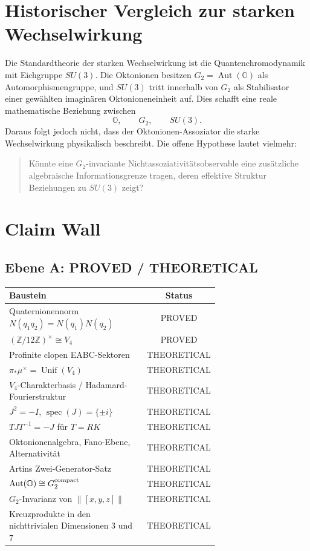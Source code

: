 \documentclass[11pt,a4paper]{article}
\newcommand{\OO}{\mathbb O}
\newcommand{\ZZ}{\mathbb Z}
\newcommand{\norm}[1]{\left\lVert #1 \right\rVert}
\newcommand{\Aut}{\operatorname{Aut}}
\newcommand{\Unif}{\operatorname{Unif}}
\begin{document}
\section{Historischer Vergleich zur starken Wechselwirkung}
Die Standardtheorie der starken Wechselwirkung ist die Quantenchromodynamik mit Eichgruppe $SU(3)$. Die Oktonionen besitzen $G_2=\Aut(\OO)$ als Automorphismengruppe, und $SU(3)$ tritt innerhalb von $G_2$ als Stabilisator einer gewählten imaginären Oktonioneneinheit auf. Dies schafft eine reale mathematische Beziehung zwischen
\[
\OO,\qquad G_2,\qquad SU(3).
\]
Daraus folgt jedoch nicht, dass der Oktonionen-Assoziator die starke Wechselwirkung physikalisch beschreibt. Die offene Hypothese lautet vielmehr:
\begin{quote}
Könnte eine $G_2$-invariante Nichtassoziativitätsobservable eine zusätzliche algebraische Informationsgrenze tragen, deren effektive Struktur Beziehungen zu $SU(3)$ zeigt?
\end{quote}

\section{Claim Wall}
\subsection*{Ebene A: PROVED / THEORETICAL}
\begin{center}
\begin{tabular}{>{\raggedright\arraybackslash}p{0.69\linewidth}|c}
\toprule
\textbf{Baustein} & \textbf{Status}\\
\midrule
Quaternionennorm $N(q_1q_2)=N(q_1)N(q_2)$ & PROVED\\
$(\ZZ/12\ZZ)^\times\cong V_4$ & PROVED\\
Profinite clopen EABC-Sektoren & THEORETICAL\\
$\pi_*\mu^\times=\Unif(V_4)$ & THEORETICAL\\
$V_4$-Charakterbasis / Hadamard-Fourierstruktur & THEORETICAL\\
$J^2=-I$, $\operatorname{spec}(J)=\{\pm i\}$ & THEORETICAL\\
$TJT^{-1}=-J$ für $T=RK$ & THEORETICAL\\
Oktonionenalgebra, Fano-Ebene, Alternativität & THEORETICAL\\
Artins Zwei-Generator-Satz & THEORETICAL\\
$\Aut(\OO)\cong G_2^{\rm compact}$ & THEORETICAL\\
$G_2$-Invarianz von $\norm{[x,y,z]}$ & THEORETICAL\\
Kreuzprodukte in den nichttrivialen Dimensionen $3$ und $7$ & THEORETICAL\\
\bottomrule
\end{tabular}
\end{center}
\end{document}
